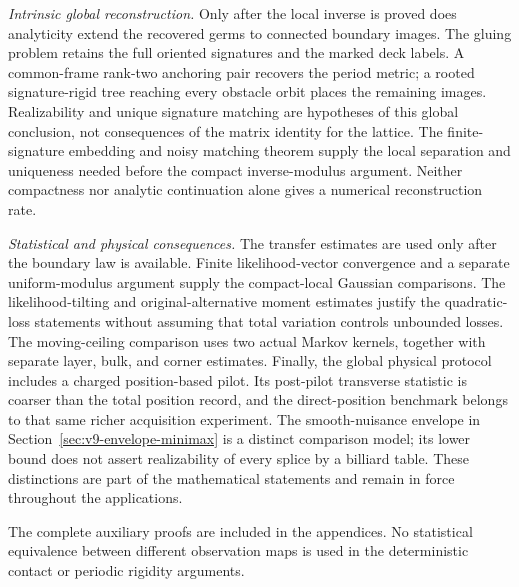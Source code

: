 \emph{Intrinsic global reconstruction.}
Only after the local inverse is proved does analyticity extend the
recovered germs to connected boundary images.  The gluing problem
retains the full oriented signatures and the marked deck labels.
A common-frame rank-two anchoring pair recovers the period metric;
a rooted signature-rigid tree reaching every obstacle orbit places the
remaining images.  Realizability and unique signature matching are
hypotheses of this global conclusion, not consequences of the matrix
identity for the lattice.  The finite-signature embedding and noisy
matching theorem supply the local separation and uniqueness needed
before the compact inverse-modulus argument.  Neither compactness nor
analytic continuation alone gives a numerical reconstruction rate.

\emph{Statistical and physical consequences.}
The transfer estimates are used only after the boundary law is available.
Finite likelihood-vector convergence and a separate uniform-modulus
argument supply the compact-local Gaussian comparisons.  The
likelihood-tilting and original-alternative moment estimates justify the
quadratic-loss statements without assuming that total variation controls
unbounded losses.  The moving-ceiling comparison uses two actual Markov
kernels, together with separate layer, bulk, and corner estimates.
Finally, the global physical protocol includes a charged position-based
pilot.  Its post-pilot transverse statistic is coarser than the total
position record, and the direct-position benchmark belongs to that same
richer acquisition experiment.  The smooth-nuisance envelope in
Section~\ref{sec:v9-envelope-minimax} is a distinct comparison model;
its lower bound does not assert realizability of every splice by a
billiard table.  These distinctions are part of the mathematical
statements and remain in force throughout the applications.

The complete auxiliary proofs are included in the appendices.  No
statistical equivalence between different observation maps is used in
the deterministic contact or periodic rigidity arguments.
